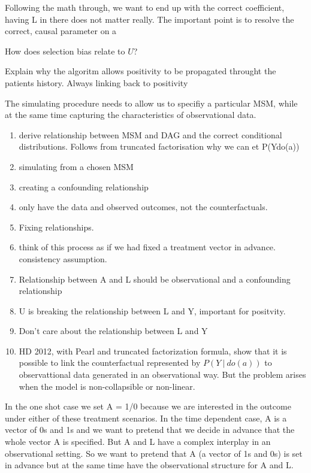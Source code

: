 \documentclass[11pt]{article}
\begin{document}
Following the math through, we want to end up with the correct
coefficient, having L in there does not matter really. The important
point is to resolve the correct, causal parameter on a

How does selection bias relate to \(U\)?

Explain why the algoritm allows positivity to be propagated throught the
patients history. Always linking back to positivity

The simulating procedure needs to allow us to specifiy a particular MSM,
while at the same time capturing the characteristics of observational
data.

\begin{enumerate}
\def\labelenumi{\arabic{enumi}.}
\item
  derive relationship between MSM and DAG and the correct conditional
  distributions. Follows from truncated factorisation why we can et
  P(Y\textbar{}do(a))
\item
  simulating from a chosen MSM
\item
  creating a confounding relationship
\item
  only have the data and observed outcomes, not the counterfactuals.
\item
  Fixing relationships.
\item
  think of this process as if we had fixed a treatment vector in
  advance. consistency assumption.
\item
  Relationship between A and L should be observational and a confounding
  relationship
\item
  U is breaking the relationship between L and Y, important for
  positvity.
\item
  Don't care about the relationship between L and Y
\item
  HD 2012, with Pearl and truncated factorization formula, show that it
  is possible to link the counterfactual represented by
  \(P(Y\ |\ do(a))\) to observattional data generated in an
  observational way. But the problem arises when the model is
  non-collapsible or non-linear.
\end{enumerate}

In the one shot case we set A = 1/0 because we are interested in the
outcome under either of these treatment scenarios. In the time dependent
case, A is a vector of 0s and 1s and we want to pretend that we decide
in advance that the whole vector A is specified. But A and L have a
complex interplay in an observational setting. So we want to pretend
that A (a vector of 1s and 0s) is set in advance but at the same time
have the observational structure for A and L.
\end{document}
